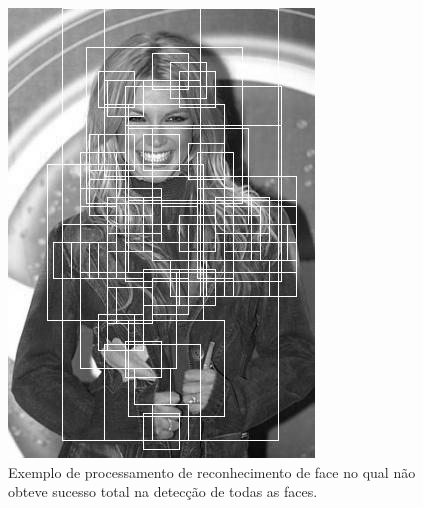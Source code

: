 \documentclass[10pt, conference]{IEEEtran}
\begin{document}
	\begin{figure}[ht]
		\centering
		\includegraphics[width=0.75\linewidth]{img/detect_5.jpg}
		\caption{Exemplo de processamento de reconhecimento de face no qual não obteve sucesso total na detecção de todas as faces.}
		\label{fig:detect_5}
	\end{figure}
\end{document}
